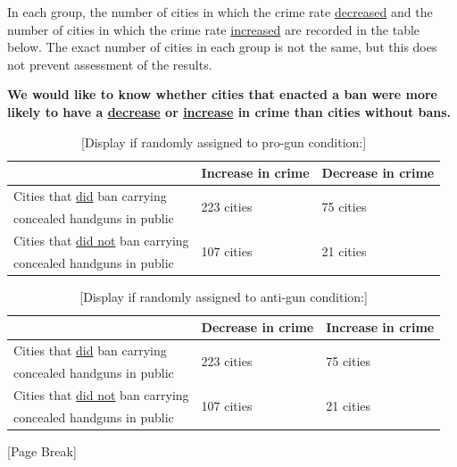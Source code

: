 \documentclass[12pt, letterpaper]{article}
\begin{document}
\medskip
In each group, the number of cities in which the crime rate \uline{decreased} and the number of cities in which the crime rate \uline{increased} are recorded in the table below. The exact number of cities in each group is not the same, but this does not prevent assessment of the results.

\medskip
\textbf{We would like to know whether cities that enacted a ban were more likely to have a \underline{decrease} or \underline{increase} in crime than cities without bans.}

\begin{table}[h]
\centering
\caption*{{[}Display if randomly assigned to pro-gun condition:{]}} \label{tab:siprogun}
\begin{tabular}{|l|l|l|}
\hline 
  & Increase in crime  & Decrease in crime \\\hline
  Cities that \underline{did} ban carrying     & \multirow{2}{*}{223 cities} & \multirow{2}{*}{75 cities} \\ 
  concealed handguns in public           &               & \\ \hline
  Cities that \underline{did not} ban carrying & \multirow{2}{*}{107 cities} & \multirow{2}{*}{21 cities} \\ 
  concealed handguns in public           &               &  \\\hline
\end{tabular}
\end{table}

\vspace{-5mm}
\begin{table}[h]
\centering
\caption*{{[}Display if randomly assigned to anti-gun condition:{]}} \label{tab:siantigun}
\begin{tabular}{|l|l|l|}
\hline 
  & Decrease in crime & Increase in crime \\\hline
  Cities that \underline{did} ban carrying     & \multirow{2}{*}{223 cities} & \multirow{2}{*}{75 cities} \\ 
  concealed handguns in public           &               & \\ \hline
  Cities that \underline{did not} ban carrying & \multirow{2}{*}{107 cities} & \multirow{2}{*}{21 cities} \\ 
  concealed handguns in public           &               &  \\\hline
\end{tabular}
\end{table}

\vspace{-5mm}
\begin{center}
 {[}Page Break{]}
\end{center}
\end{document}
